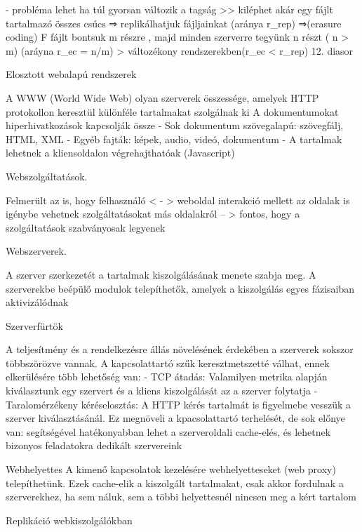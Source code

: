 \documentclass[12pt]{article}
\begin{document}
\begin{description}[style=unboxed]
        - probléma lehet ha túl gyorsan változik a tagság >> kiléphet akár egy fájlt tartalmazó összes csúcs
        ⇒ replikálhatjuk fájljainkat (aránya r\_rep)
        ⇒(erasure coding) F fájlt bontsuk m részre , majd minden szerverre
        tegyünk n részt ( n > m) (aráyna r\_ec = n/m) 
        > változékony rendszerekben(r\_ec < r\_rep)
        12. diasor
    \item  Elosztott webalapú rendszerek
    \item A WWW (World Wide Web) olyan szerverek összessége, amelyek HTTP protokollon keresztül különféle tartalmakat szolgálnak ki
        A dokumentumokat hiperhivatkozások kapcsolják össze
        - Sok dokumentum szövegalapú: szövegfálj, HTML, XML
        - Egyéb fajták: képek, audio, videó, dokumentum
        - A tartalmak lehetnek a kliensoldalon végrehajthatóak (Javascript)
    \item  Webszolgáltatások.
    \item Felmerült az is, hogy felhasználó < - > weboldal interakció mellett az oldalak is igénybe vehetnek szolgáltatásokat más
        oldalakról -- > fontos, hogy a szolgáltatások szabványosak legyenek
    \item  Webszerverek.
    \item A szerver szerkezetét a tartalmak kiszolgálásának menete szabja meg. A szerverekbe beépülő modulok telepíthetők,
        amelyek a kiszolgálás egyes fázisaiban aktivizálódnak
    \item  Szerverfürtök    
    \item A teljesítmény és a rendelkezésre állás növelésének érdekében a szerverek sokszor többszörözve vannak.
        A kapcsolattartó szűk keresztmetszetté válhat, ennek elkerülésére több lehetőség van:
        - TCP átadás: Valamilyen metrika alapján kiválasztunk egy szervert és a kliens kiszolgálását az a szerver folytatja
        - Taralomérzékeny kéréselosztás: A HTTP kérés tartalmát is figyelmebe vesszük a szerver kiválasztásánál. Ez megnöveli
        a kpacsolattartó terhelését, de sok előnye van: segítségével hatékonyabban lehet a szerveroldali cache-elés, és lehetnek
        bizonyos feladatokra dedikált szervereink
    \item  Webhelyettes
        A kimenő kapcsolatok kezelésére webhelyetteseket (web proxy) telepíthetünk. Ezek cache-elik a kiszolgált tartalmakat,
        csak akkor fordulnak a szerverekhez, ha sem náluk, sem a többi helyettesnél nincsen meg a kért tartalom
    \item  Replikáció webkiszolgálókban

\end{description}
\end{document}
